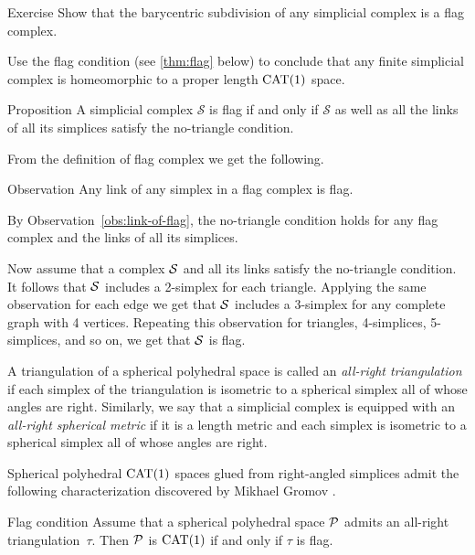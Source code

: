 \begin{thm}{Exercise}\label{ex:baricenric-flag}
Show that the barycentric subdivision of any simplicial complex is a flag complex.

Use the flag condition (see \ref{thm:flag} below)
to conclude that any finite simplicial complex is homeomorphic to a proper length $\mathrm{CAT}(1)$ space.

\end{thm}


\begin{thm}{Proposition}\label{prop:no-trig}
A simplicial complex $\mathcal{S}$ is flag if and only if 
$\mathcal{S}$ as well as all the links of all its simplices
satisfy the no-triangle condition.
\end{thm}

From the definition of flag complex 
we get the following.

\begin{thm}{Observation}\label{obs:link-of-flag}
Any link of any simplex in a flag complex is flag.
\end{thm}


By Observation~\ref{obs:link-of-flag}, the no-triangle condition holds 
for any flag complex and the  links of all its simplices.

Now assume that a complex $\mathcal{S}$ and all its links satisfy 
the no-triangle condition.
It follows that $\mathcal{S}$ includes a 2-simplex for each triangle.
Applying the same observation for each edge we get that $\mathcal{S}$ 
includes a 3-simplex for any complete graph with 4 vertices.
Repeating this observation 
for triangles, 
4-simplices,
5-simplices,
and so on, we get that $\mathcal{S}$ is flag.
\qeds


A triangulation of a spherical polyhedral space 
is called an  \emph{all-right triangulation} 
if each simplex of the triangulation is isometric 
to a spherical simplex all of whose angles are right.
Similarly, we say that a simplicial complex 
is equipped with an  \emph{all-right spherical metric}
if it is a length metric and each simplex is isometric 
to a spherical simplex all of whose angles are right.

Spherical polyhedral $\mathrm{CAT}(1)$ spaces glued from right-angled simplices
admit the following characterization 
discovered by Mikhael Gromov \cite[p.~122]{gromov-1987}.

\begin{thm}{Flag condition}\label{thm:flag}
Assume that a spherical polyhedral space $\mathcal{P}$
admits an all-right triangulation~$\tau$.
Then $\mathcal{P}$ is $\mathrm{CAT}(1)$
if and only if $\tau$ is flag.
\end{thm}

